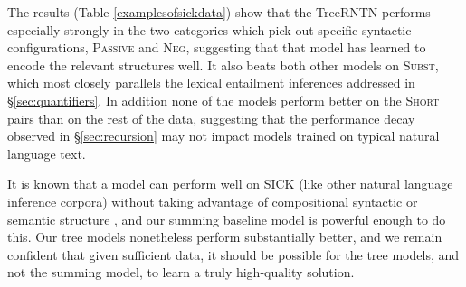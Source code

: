 The results (Table \ref{examplesofsickdata}) show that the TreeRNTN performs especially strongly in the two categories which pick out specific syntactic configurations, \textsc{Passive} and \textsc{Neg}, suggesting that that model has learned to encode the relevant structures well. It also beats both other models on \textsc{Subst}, which most closely parallels the lexical entailment inferences addressed in \S\ref{sec:quantifiers}. In addition none of the models perform better on the \textsc{Short} pairs than on the rest of the data, suggesting that the performance decay observed in \S\ref{sec:recursion} may not impact models trained on typical natural language text.

It is known that a model can perform well on SICK (like other natural language inference corpora) without taking advantage of compositional syntactic or semantic structure \cite{marelli2014semeval}, and our summing baseline model is powerful enough to do this. Our tree models nonetheless perform substantially better, and we remain confident that given sufficient data, it should be possible for the tree models, and not the summing model, to learn a truly high-quality solution.
